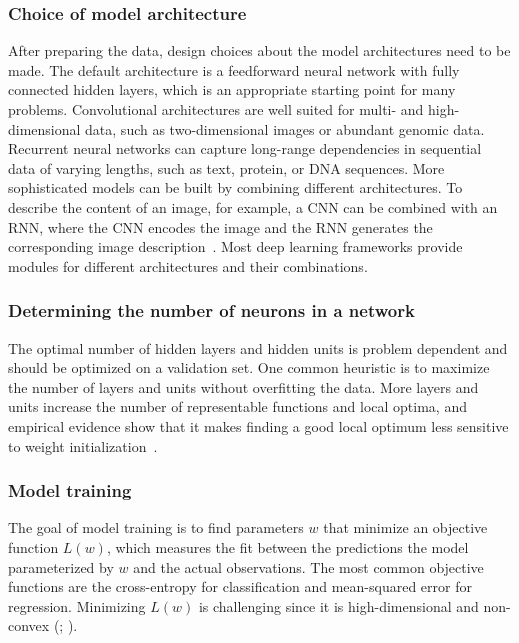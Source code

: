 \subsubsection{Choice of model architecture}
After preparing the data, design choices about the model architectures need to be made. The default architecture is a feedforward neural network with fully connected hidden layers, which is an appropriate starting point for many problems. Convolutional architectures are well suited for multi- and high-dimensional data, such as two-dimensional images or abundant genomic data. Recurrent neural networks can capture long-range dependencies in sequential data of varying lengths, such as text, protein, or DNA sequences. More sophisticated models can be built by combining different architectures. To describe the content of an image, for example, a CNN can be combined with an RNN, where the CNN encodes the image and the RNN generates the corresponding image description~\citep{vinyals_show_2015,xu_ask_2015}. Most deep learning frameworks provide modules for different architectures and their combinations.

\subsubsection{Determining the number of neurons in a network}
The optimal number of hidden layers and hidden units is problem dependent and should be optimized on a validation set. One common heuristic is to maximize the number of layers and units without overfitting the data. More layers and units increase the number of representable functions and local optima, and empirical evidence show that it makes finding a good local optimum less sensitive to weight initialization~\citep{dauphin_identifying_2014}.


\subsubsection{Model training}
The goal of model training is to find parameters $w$ that minimize an objective function $L(w)$, which measures the fit between the predictions the model parameterized by $w$ and the actual observations. The most common objective functions are the cross-entropy for classification and mean-squared error for regression. Minimizing $L(w)$ is challenging since it is high-dimensional and non-convex (; ).

